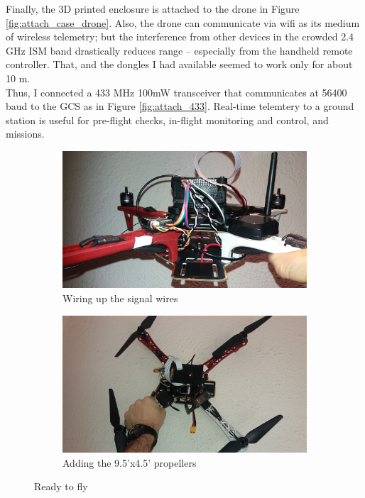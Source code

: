 \noindent
Finally, the 3D printed enclosure is attached to the drone in Figure \ref{fig:attach_case_drone}. Also, the drone can communicate via wifi as its medium of wireless telemetry; but the interference from other devices in the crowded 2.4 GHz ISM band drastically reduces range -- especially from the handheld remote controller. That, and the dongles I had available seemed to work only for about 10 m.\\

\noindent
Thus, I connected a 433 MHz 100mW transceiver that communicates at 56400 baud to the GCS as in Figure \ref{fig:attach_433}. Real-time telemtery to a ground station is useful for pre-flight checks, in-flight monitoring and control, and missions.

\begin{figure}[H]
\begin{subfigure}{0.5\textwidth}
\centering
\includegraphics[scale=0.1]{images/drone-build-signal-wires.jpg}
\caption{Wiring up the signal wires}
\label{fig:attach_sbus}
\end{subfigure}
\begin{subfigure}{0.5\textwidth}
\centering
\includegraphics[scale=0.1]{images/drone-build-props.jpg}
\caption{Adding the 9.5'x4.5' propellers}
\label{fig:attach_props}
\end{subfigure}
\caption{Ready to fly}
\label{fig:attach_signal_props}
\end{figure}

